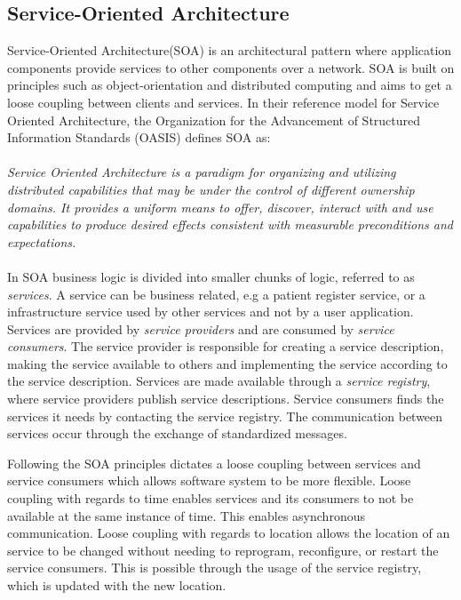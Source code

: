 \documentclass[USenglish]{ifimaster}
\begin{document}
\subsection{Service-Oriented Architecture}
Service-Oriented Architecture(SOA) is an architectural pattern where application components provide services to other components over a network. SOA is built on principles such as object-orientation and distributed computing and aims to get a loose coupling between clients and services. In their reference model for Service Oriented Architecture\cite{oasis-soa-reference-model}, the Organization for the Advancement of Structured Information Standards (OASIS) defines SOA as:
\paragraph{}
\textit{Service Oriented Architecture is a paradigm for organizing and utilizing distributed capabilities that may be under the control of different ownership domains. It provides a uniform means to offer, discover, interact with and use capabilities to produce desired effects consistent with measurable preconditions and expectations.}

\paragraph{}
In SOA business logic is divided into smaller chunks of logic, referred to as \textit{services}. A service can be business related, e.g a patient register service, or a infrastructure service used by other services and not by a user application.  Services are provided by \textit{service providers} and are consumed by \textit{service consumers}. The service provider is responsible for creating a service description, making the service available to others and implementing the service according to the service description. Services are made available through a \textit{service registry}, where service providers publish service descriptions. Service consumers finds the services it needs by contacting the service registry. The communication between services occur through the exchange of standardized messages.

Following the SOA principles dictates a loose coupling between services and service consumers which allows software system to be more flexible. Loose coupling with regards to time enables services and its consumers to not be available at the same instance of time. This enables asynchronous communication. Loose coupling with regards to location allows the location of an service to be changed without needing to reprogram, reconfigure, or restart the service consumers. This is possible through the usage of the service registry, which is updated with the new location.
\end{document}
